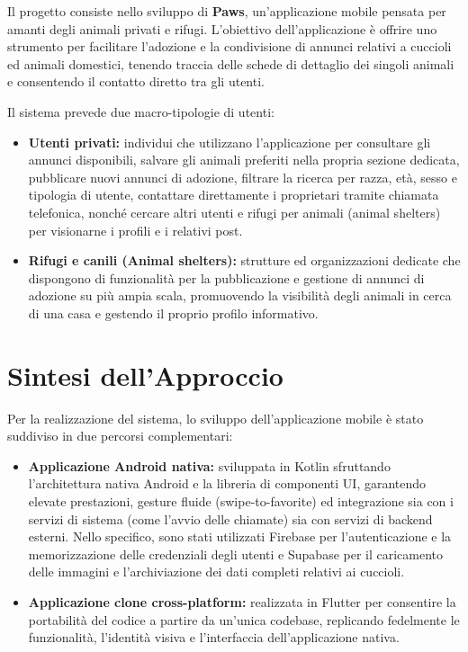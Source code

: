 \documentclass[a4paper]{report}
\begin{document}
\tableofcontents
\thispagestyle{empty}

\setcounter{page}{0}

\clearpage
{}
Il progetto consiste nello sviluppo di \textbf{Paws}, un'applicazione mobile pensata per amanti degli animali privati e rifugi. L'obiettivo dell'applicazione è offrire uno strumento per facilitare l'adozione e la condivisione di annunci relativi a cuccioli ed animali domestici, tenendo traccia delle schede di dettaglio dei singoli animali e consentendo il contatto diretto tra gli utenti.

\noindent Il sistema prevede due macro-tipologie di utenti:
\begin{itemize}
   \item \textbf{Utenti privati:} individui che utilizzano l'applicazione per consultare gli annunci disponibili, salvare gli animali preferiti nella propria sezione dedicata, pubblicare nuovi annunci di adozione, filtrare la ricerca per razza, età, sesso e tipologia di utente, contattare direttamente i proprietari tramite chiamata telefonica, nonché cercare altri utenti e rifugi per animali (animal shelters) per visionarne i profili e i relativi post.
   \item \textbf{Rifugi e canili (Animal shelters):} strutture ed organizzazioni dedicate che dispongono di funzionalità per la pubblicazione e gestione di annunci di adozione su più ampia scala, promuovendo la visibilità degli animali in cerca di una casa e gestendo il proprio profilo informativo.
\end{itemize}

\section*{Sintesi dell'Approccio}
Per la realizzazione del sistema, lo sviluppo dell'applicazione mobile è stato suddiviso in due percorsi complementari:
\begin{itemize}
   \item \textbf{Applicazione Android nativa:} sviluppata in Kotlin sfruttando l'architettura nativa Android e la libreria di componenti UI, garantendo elevate prestazioni, gesture fluide (swipe-to-favorite) ed integrazione sia con i servizi di sistema (come l'avvio delle chiamate) sia con servizi di backend esterni. Nello specifico, sono stati utilizzati Firebase per l'autenticazione e la memorizzazione delle credenziali degli utenti e Supabase per il caricamento delle immagini e l'archiviazione dei dati completi relativi ai cuccioli.
   \item \textbf{Applicazione clone cross-platform:} realizzata in Flutter per consentire la portabilità del codice a partire da un'unica codebase, replicando fedelmente le funzionalità, l'identità visiva e l'interfaccia dell'applicazione nativa.
\end{itemize}
\end{document}
